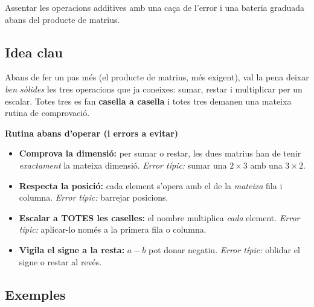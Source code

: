 %
{Assentar les operacions additives amb una caça de l'error i una bateria graduada abans del producte de matrius.}

\subsection{Idea clau}

Abans de fer un pas més (el producte de matrius, més exigent), val la pena
deixar \emph{ben sòlides} les tres operacions que ja coneixes: sumar, restar i
multiplicar per un escalar. Totes tres es fan \textbf{casella a casella} i
totes tres demanen una mateixa rutina de comprovació.

\begin{idea}
\textbf{Rutina abans d'operar (i errors a evitar)}
\begin{itemize}[leftmargin=1.4em, itemsep=2pt]
  \item \textbf{Comprova la dimensió:} per sumar o restar, les dues matrius han
        de tenir \emph{exactament} la mateixa dimensió. \emph{Error típic:} sumar
        una $2\times 3$ amb una $3\times 2$.
  \item \textbf{Respecta la posició:} cada element s'opera amb el de la
        \emph{mateixa} fila i columna. \emph{Error típic:} barrejar posicions.
  \item \textbf{Escalar a TOTES les caselles:} el nombre multiplica \emph{cada}
        element. \emph{Error típic:} aplicar-lo només a la primera fila o columna.
  \item \textbf{Vigila el signe a la resta:} $a-b$ pot donar negatiu.
        \emph{Error típic:} oblidar el signe o restar al revés.
\end{itemize}
\end{idea}

\subsection{Exemples}

